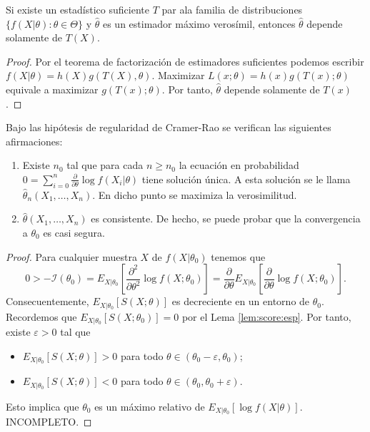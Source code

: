     \begin{prop}
        Si existe un estadístico suficiente $T$ par ala familia de distribuciones $\{f(X|\theta): \theta \in \Theta\}$ y $\hat\theta$ es un estimador máximo verosímil, entonces $\hat\theta$ depende solamente de $T(X)$.
    \end{prop}
    \begin{proof}
        Por el teorema de factorización de estimadores suficientes podemos escribir $f(X|\theta) = h(X) g(T(X), \theta)$. Maximizar $L(x; \theta) = h(x) g(T(x); \theta)$ equivale a maximizar $g(T(x); \theta)$. Por tanto, $\hat\theta$ depende solamente de $T(x)$.
    \end{proof}

    \begin{thm}
        Bajo las hipótesis de regularidad de Cramer-Rao se verifican las siguientes afirmaciones:
        \begin{enumerate}
            \item Existe $n_0$ tal que para cada $n \ge n_0$ la ecuación en probabilidad $0 =\sum_{i=0}^n \frac{\partial}{\partial \theta} \log f(X_i | \theta)$ tiene solución única. A esta solución se le llama $\hat{\theta}_n(X_1, \ldots, X_n)$. En dicho punto se maximiza la verosimilitud.
            \item $\hat{\theta}(X_1, \ldots, X_n)$ es consistente. De hecho, se puede probar que la convergencia a $\theta_0$ es casi segura.
        \end{enumerate}
    \end{thm}
    \begin{proof}
        Para cualquier muestra $X$ de $f(X|\theta_0)$ tenemos que
        \[0 > -\mathcal{I}(\theta_0)=E_{X|\theta_0}\left[ \frac{\partial^2}{\partial\theta^2} \log f(X;\theta_0)\right] = \frac{\partial}{\partial\theta} E_{X|\theta_0} \left[ \frac{\partial}{\partial\theta} \log f(X;\theta_0) \right].\]
        Consecuentemente, $E_{X|\theta_0} \left[ S(X; \theta) \right]$ es decreciente en un entorno de $\theta_0$. Recordemos que $E_{X|\theta_0} \left[ S(X; \theta_0) \right] = 0$ por el Lema \ref{lem:score:esp}. Por tanto, existe $\varepsilon > 0$ tal que
        \begin{itemize}
            \item $E_{X|\theta_0} \left[ S(X; \theta) \right] > 0$ para todo $\theta \in (\theta_0 - \varepsilon, \theta_0)$;
            \item $E_{X|\theta_0} \left[ S(X; \theta) \right] < 0$ para todo $\theta \in (\theta_0, \theta_0 + \varepsilon)$.
        \end{itemize}
        Esto implica que $\theta_0$ es un máximo relativo de $E_{X|\theta_0}[\log f(X|\theta)]$.
        INCOMPLETO.
    \end{proof}

